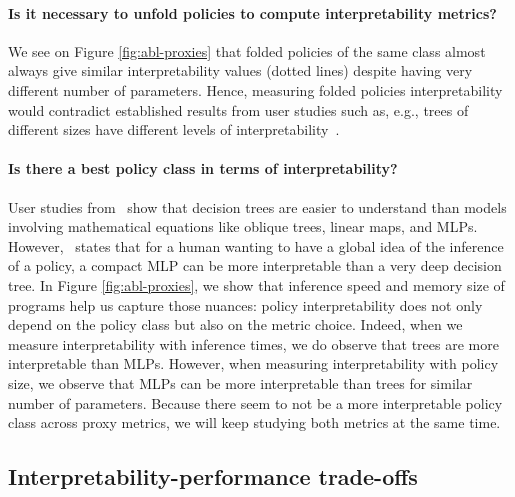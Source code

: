 \paragraph{Is it necessary to unfold policies to compute interpretability metrics?} We see on Figure \ref{fig:abl-proxies} that folded policies of the same class almost always give similar interpretability values (dotted lines) despite having very different number of parameters. Hence, measuring folded policies interpretability would contradict established results from user studies such as, e.g., trees of different sizes have different levels of interpretability~\cite{study-4}. 

\paragraph{Is there a best policy class in terms of interpretability?}
User studies from~\cite{study-1,study-2,study-3} show that decision trees are easier to understand than models involving mathematical equations like oblique trees, linear maps, and MLPs. However,~\cite{mythos} states that for a human wanting to have a global idea of the inference of a policy, a compact MLP can be more interpretable than a very deep decision tree. In Figure \ref{fig:abl-proxies}, we show that inference speed and memory size of programs help us capture those nuances: policy interpretability does not only depend on the policy class but also on the metric choice. Indeed, when we measure interpretability with inference times, we do observe that trees are more interpretable than MLPs. However, when measuring interpretability with policy size, we observe that MLPs can be more interpretable than trees for similar number of parameters. Because there seem to not be a more interpretable policy class across proxy metrics, we will keep studying both metrics at the same time.




\subsection{Interpretability-performance trade-offs}\label{sec:res-trade-offs}

